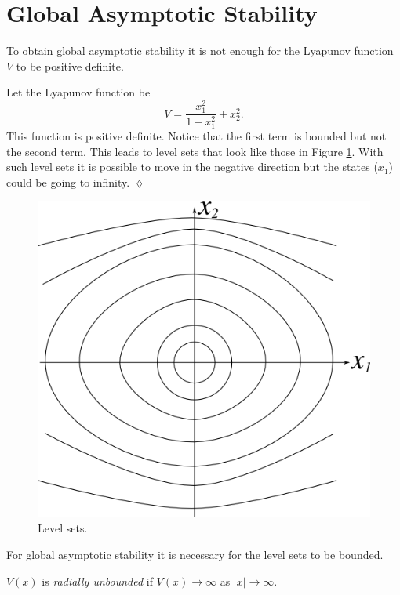 
\mainmatter
\setcounter{page}{1}

\lectureseries[\course]{\course}

\date{February 4, 2010}

\setaddress

\setcounter{lecture}{9}
\setcounter{chapter}{9}


\section{Global Asymptotic Stability}
To obtain global asymptotic stability it is not enough for the Lyapunov function $V$ to be positive definite.

\begin{example}
Let the Lyapunov function be
$$V = \frac{x_1^2}{1+x_1^2} + x_2^2.$$
This function is positive definite. Notice that the first term is bounded but not the second term. This leads to level sets that look like those in Figure \ref{fig:10levelSets}. With such level sets it is possible to move in the negative direction but the states ($x_1$) could be going to infinity.
$\lozenge$
\end{example}

\begin{figure}[ht!]
	\centering
	\includegraphics[width=.4\textwidth]{images/10levelSets}
	\caption{Level sets.}
	\label{fig:10levelSets}
\end{figure}

For global asymptotic stability it is necessary for the level sets to be bounded.

\begin{definition}
$V(x)$ is \textit{radially unbounded} if $V(x)\to\infty$ as $|x|\to\infty$.
\end{definition}

